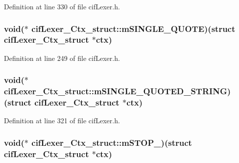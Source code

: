 Definition at line 330 of file cif\-Lexer.\-h.

\hypertarget{structcif_lexer___ctx__struct_ad0dc7e6463b8cfd4948a3cdc764e07b9}{
\subsubsection[{m\-S\-I\-N\-G\-L\-E\-\_\-\-Q\-U\-O\-T\-E}]{\setlength{\rightskip}{0pt plus 5cm}void($\ast$ cif\-Lexer\-\_\-\-Ctx\-\_\-struct\-::m\-S\-I\-N\-G\-L\-E\-\_\-\-Q\-U\-O\-T\-E)(struct {\bf cif\-Lexer\-\_\-\-Ctx\-\_\-struct} $\ast$ctx)}}\label{structcif_lexer___ctx__struct_ad0dc7e6463b8cfd4948a3cdc764e07b9}


Definition at line 249 of file cif\-Lexer.\-h.

\hypertarget{structcif_lexer___ctx__struct_ab4cb027bc2663c343c47f519376587c3}{
\subsubsection[{m\-S\-I\-N\-G\-L\-E\-\_\-\-Q\-U\-O\-T\-E\-D\-\_\-\-S\-T\-R\-I\-N\-G}]{\setlength{\rightskip}{0pt plus 5cm}void($\ast$ cif\-Lexer\-\_\-\-Ctx\-\_\-struct\-::m\-S\-I\-N\-G\-L\-E\-\_\-\-Q\-U\-O\-T\-E\-D\-\_\-\-S\-T\-R\-I\-N\-G)(struct {\bf cif\-Lexer\-\_\-\-Ctx\-\_\-struct} $\ast$ctx)}}\label{structcif_lexer___ctx__struct_ab4cb027bc2663c343c47f519376587c3}


Definition at line 321 of file cif\-Lexer.\-h.

\hypertarget{structcif_lexer___ctx__struct_ada5c0b457677b75f32e3c1d365793653}{
\subsubsection[{m\-S\-T\-O\-P\-\_\-}]{\setlength{\rightskip}{0pt plus 5cm}void($\ast$ cif\-Lexer\-\_\-\-Ctx\-\_\-struct\-::m\-S\-T\-O\-P\-\_\-)(struct {\bf cif\-Lexer\-\_\-\-Ctx\-\_\-struct} $\ast$ctx)}}\label{structcif_lexer___ctx__struct_ada5c0b457677b75f32e3c1d365793653}


